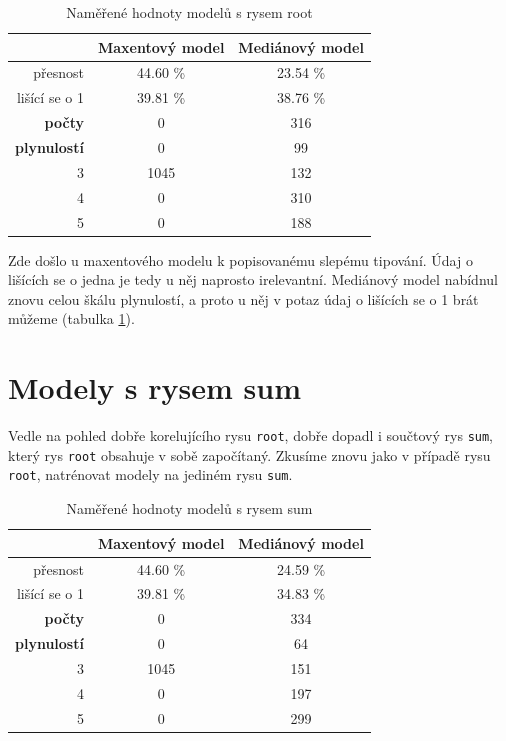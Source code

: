 \documentclass[12pt,a4paper]{report}
\begin{document}
\begin{table}[!htbp]
\begin{center}
\begin{tabular}{|r|c|c|}
\hline
 & \textbf{Maxentový model} & \textbf{Mediánový model} \\
 \hline
     přesnost & 44.60 \%  & 23.54 \%  \\
\hline
lišící se o 1 & 39.81 \% & 38.76 \%  \\
\hline
     \textbf{počty} \quad 1 & \color{red}0   & \color{OliveGreen}316   \\
\textbf{plynulostí} \quad 2 & \color{red}0 & \color{OliveGreen}99   \\
                          3 & 1045 & \color{OliveGreen}132 \\
                          4 & \color{red}0   & \color{OliveGreen}310 \\
                          5 & \color{red}0   & \color{OliveGreen}188  \\
\hline
\end{tabular}
\caption{Naměřené hodnoty modelů s rysem root}\label{tb:root}
\end{center}
\end{table}

Zde došlo u maxentového modelu k popisovanému slepému tipování. Údaj o lišících se o jedna je tedy u něj naprosto irelevantní. Mediánový model nabídnul znovu celou škálu plynulostí, a proto u něj v potaz údaj o lišících se o 1 brát můžeme (tabulka \ref{tb:root}).

\section{Modely s rysem sum}
Vedle na pohled dobře korelujícího rysu \texttt{root}, dobře dopadl i součtový rys \texttt{sum}, který rys \texttt{root} obsahuje v sobě započítaný. Zkusíme znovu jako v případě rysu \texttt{root}, natrénovat modely na jediném rysu \texttt{sum}.

\begin{table}[!htbp]
\begin{center}
\begin{tabular}{|r|c|c|}
\hline
 & \textbf{Maxentový model} & \textbf{Mediánový model} \\
 \hline
     přesnost & 44.60 \%  & 24.59 \%  \\
\hline
lišící se o 1 & 39.81 \% & 34.83 \%  \\
\hline
     \textbf{počty} \quad 1 & \color{red}0   & \color{OliveGreen}334   \\
\textbf{plynulostí} \quad 2 & \color{red}0 & \color{OliveGreen}64   \\
                          3 & 1045 & \color{OliveGreen}151 \\
                          4 & \color{red}0   & \color{OliveGreen}197 \\
                          5 & \color{red}0   & \color{OliveGreen}299  \\
\hline
\end{tabular}
\caption{Naměřené hodnoty modelů s rysem sum}\label{tb:sum}
\end{center}
\end{table}
\end{document}
